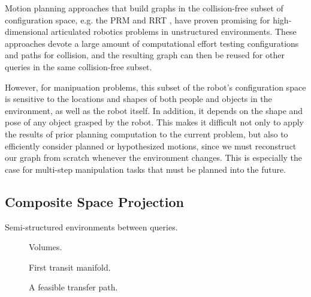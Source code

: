 Motion planning approaches that build graphs
in the collision-free subset of
configuration space,
e.g. the
PRM \citep{kavrakietal1996prm}
and RRT \citep{lavallekuffner1999rrt},
have proven promising
for high-dimensional articulated robotics problems
in unstructured environments.
These approaches devote a large amount of computational effort
testing configurations and paths for collision,
and the resulting graph can then be reused
for other queries in the same collision-free subset.

However,
for manipuation problems,
this subset of the robot's configuration space
is sensitive to the locations and shapes of
both people and objects in the environment,
as well as the robot itself.
In addition, it depends on the shape and pose of any object
grasped by the robot.
This makes it difficult not only to apply the results of prior
planning computation to the current problem,
but also to efficiently consider planned or hypothesized motions,
since we must reconstruct our graph from scratch whenever
the environment changes.
This is especially the case for
multi-step manipulation tasks that must be planned into the future.

\subsection{Composite Space Projection}

Semi-structured environments between queries.

\begin{figure}
   \centering
   \caption{Volumes.}
\end{figure}

\begin{figure}
   \centering
   \caption{First transit manifold.}
\end{figure}

\begin{figure}
   \centering
   \caption{A feasible transfer path.}
\end{figure}

